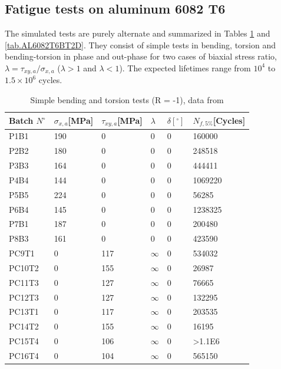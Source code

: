 \documentclass[3p,times,procedia,number]{elsarticle}
\begin{document}
\subsection{Fatigue tests on aluminum 6082 T6}
The simulated tests are purely alternate and summarized in Tables \ref{tab.AL6082T6BT1D} and \ref{tab.AL6082T6BT2D}. They consist of simple tests in bending, torsion and bending-torsion in phase and out-phase for two cases of biaxial stress ratio, $\lambda=\tau_{xy,a}/\sigma_{x,a}$
($\lambda>1$ and $\lambda<1$). The expected lifetimes range from $10^4$ to $1.5\times10^6$ cycles. 
\begin{table}[!h]
	\centering
	\begin{tabular}{|l|l|l|l|l|l|}
		\hline
		Batch $N^\circ$ & $\sigma_{x,a}${[}MPa{]} & $\tau_{xy,a}${[}MPa{]} & $\lambda$ & $\delta [^\circ]$ & $N_{f,5\%}${[}Cycles{]} \\ \hline
		P1B1 & 190 & 0 & 0 & 0 & 160000 \\ \hline
		P2B2 & 180 & 0 & 0 & 0 & 248518 \\ \hline
		P3B3 & 164 & 0 & 0 & 0 & 444411 \\ \hline
		P4B4 & 144 & 0 & 0 & 0 & 1069220 \\ \hline
		P5B5 & 224 & 0 & 0 & 0 & 56285 \\ \hline
		P6B4 & 145 & 0 & 0 & 0 & 1238325 \\ \hline
		P7B1 & 187 & 0 & 0 & 0 & 200480 \\ \hline
		P8B3 & 161 & 0 & 0 & 0 & 423590 \\ \hline
		PC9T1 & 0 & 117 & $\infty$ & 0 & 534032 \\ \hline
		PC10T2 & 0 & 155 & $\infty$ & 0 & 26987 \\ \hline
		PC11T3 & 0 & 127 & $\infty$ & 0 & 76665 \\ \hline
		PC12T3 & 0 & 127 & $\infty$ & 0 & 132295 \\ \hline
		PC13T1 & 0 & 117 & $\infty$ & 0 & 203535 \\ \hline
		PC14T2 & 0 & 155 & $\infty$ & 0 & 16195 \\ \hline
		PC15T4 & 0 & 106 & $\infty$ & 0 & \textgreater1.1E6 \\ \hline
		PC16T4 & 0 & 104 & $\infty$ & 0 & 565150 \\ \hline
	\end{tabular}
	\caption{Simple bending and torsion tests (R = -1), data from \cite{susmel2003multiaxial}}
	\label{tab.AL6082T6BT1D}
\end{table}
\end{document}
